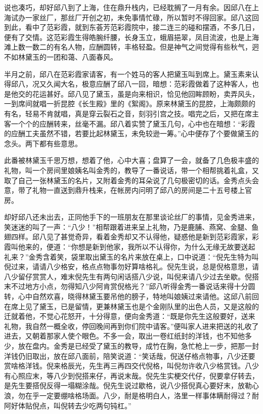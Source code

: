 \documentclass[12pt,UTF8]{ctexbook}
\begin{document}
{{{说也凑巧，却好邱八到了上海，住在鼎升栈内，已经耽搁了一月有余。因邱八在上海试办一家丝厂，那丝厂开创之初，未免事情忙碌，所以暂时不得回家。邱八这回到此，看中了范彩霞，就到东荟芳范彩霞院中，接二连三的碰和摆酒，不多几日，便有了交情。这范彩霞生得皓腕纤腰，长身玉立，蛾眉挹翠，凤目流波，也是上海滩上数一数二的有名人物，应酬圆转，丰格轻盈。但是神气之间觉得有些秋气，迥不如林黛玉的一团和蔼、八面春风。

半月之前，邱八在范彩霞家请客，有一个姓马的客人把黛玉叫到席上。黛玉素来认得邱八，况又久闻大名，极意应酬了邱八一回，暗想：范彩霞做着了这种客人，也是他交的花运甚好。邱八见了黛玉，虽是向来相识，恰见他回眸顾盼，卖弄风头，一到席间就唱一折昆腔《长生殿》里的《絮阁》。原来林黛玉的昆腔，上海颇颇的有名，轻易不肯就唱，真是穿云裂石之音，刻羽引宫之技。唱完之后，又把在席主客一个个的应酬转来，丝毫不漏。邱八着实赞了黛玉几句，心中也在暗想：“彩霞的应酬工夫虽然不错，若要比起林黛玉，未免较逊一筹。”心中便存了个要做黛玉的念头。两下都有些意思。

此番被林黛玉千思万想，想着了他，心中大喜；盘算了一会，就备了几色极丰盛的礼物，叫一个房间里娘姨名叫金秀的，教导了一番说话，带一个相帮挑着礼盒，又取了自己一张林黛玉的名片，又附着金秀的耳朵说了几句极密切的话。金秀点头会意，带了礼物一直送到鼎升栈来，在帐房内问明了邱八的房间是二十五号楼上官房。

却好邱八还未出去，正同他手下的一班朋友在那里谈论丝厂的事情，见金秀进来，笑迷迷的叫了一声：“八少！”相帮跟着进来呈上礼物，乃是鹿脯、燕窝、金腿、鱼翅四样。邱八见了甚觉奇异，看着金秀却又不认得他，疑惑他是新到范彩霞家，彩霞叫他来的，便道：“你想是新到他家，我所以不认得你，为什么无缘无故要送起礼来？”金秀含着笑，袋里取出黛玉的名片来放在桌上，口中说道：“倪先生特为叫倪过来，请请八少格安，格点点物事勿好算啥格礼。倪先生说，总是倪格意思，请八少留仔赏赏人，难末倪先生有两句闲话搭八少说，叫倪来请八少过去坐歇。倪搭末不过地方小点，勿得知八少阿肯赏倪格光？”邱八听得金秀一番说话来得十分圆转，心中自然欢喜，晓得林黛玉要吊他的膀子，特地叫娘姨过来请他。这邱八前回在席上见了黛玉，已是留情，更兼林黛玉也是个金刚队里的出色人员，又是这般的迁就着他，不觉心花怒开，十分得意，便向金秀道：“既是你先生这般要好，送来礼物，我自然一概全收，停回晚间再到你们院中请客。”便叫家人进来把送的礼收了进去，又朝着那家人使个眼色。不多一会，取出一卷红纸封的洋钱，也不知他多少，放在盘内。金秀是已经受了黛玉的教导，成竹在胸，急忙枪上一步，把那一封洋钱仍旧取出，放在邱八面前，陪笑说道：“笑话哉，倪送仔格点物事，八少还要赏啥格洋钱。倪来格辰光，先生再三再四交代倪格，叫倪勿许收八少格赏钱。八少有心照应末，等八少到倪搭来仔，再说末哉。倪先生实梗交代仔，倪要拿仔转去，是先生要搭倪反得一塌糊涂哉。倪先生说过歇格，说八少搭倪真心要好末，放勒心浪，勿在乎一定要绷啥格场面。八少，耐是格明白人，洛里一样事体瞒耐得过？耐阿好体贴倪点，叫倪转去少吃两句钝杠。”

}}}
\end{document}
